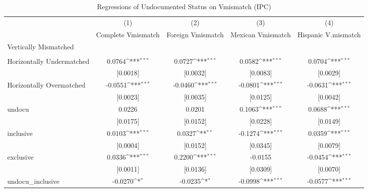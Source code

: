 \begin{table}[htbp]\centering
\def\sym#1{\ifmmode^{#1}\else\(^{#1}\)\fi}
\caption{Regressions of Undocumented Status on Vmismatch (IPC)}
\begin{tabular}{l*{4}{c}}
\toprule
                    &\multicolumn{1}{c}{(1)}         &\multicolumn{1}{c}{(2)}         &\multicolumn{1}{c}{(3)}         &\multicolumn{1}{c}{(4)}         \\
                    &Complete Vmismatch         &Foreign Vmismatch         &Mexican Vmismatch         &Hispanic V.mismatch         \\
\midrule
Vertically Mismatched&                     &                     &                     &                     \\
                    &                     &                     &                     &                     \\
\addlinespace
Horizontally Undermatched&      0.0764\sym{***}&      0.0727\sym{***}&      0.0582\sym{***}&      0.0704\sym{***}\\
                    &    [0.0018]         &    [0.0032]         &    [0.0083]         &    [0.0029]         \\
\addlinespace
Horizontally Overmatched&     -0.0551\sym{***}&     -0.0460\sym{***}&     -0.0801\sym{***}&     -0.0631\sym{***}\\
                    &    [0.0023]         &    [0.0035]         &    [0.0125]         &    [0.0042]         \\
\addlinespace
undocu              &      0.0226         &      0.0201         &      0.1063\sym{***}&      0.0688\sym{***}\\
                    &    [0.0175]         &    [0.0152]         &    [0.0228]         &    [0.0149]         \\
\addlinespace
inclusive           &      0.0103\sym{***}&      0.0327\sym{**} &     -0.1274\sym{***}&      0.0359\sym{***}\\
                    &    [0.0004]         &    [0.0152]         &    [0.0345]         &    [0.0079]         \\
\addlinespace
exclusive           &      0.0336\sym{***}&      0.2200\sym{***}&     -0.0155         &     -0.0454\sym{***}\\
                    &    [0.0011]         &    [0.0136]         &    [0.0309]         &    [0.0070]         \\
\addlinespace
undocu\_inclusive    &     -0.0270\sym{*}  &     -0.0235\sym{*}  &     -0.0998\sym{***}&     -0.0577\sym{***}\\

\end{tabular}
\end{table}
